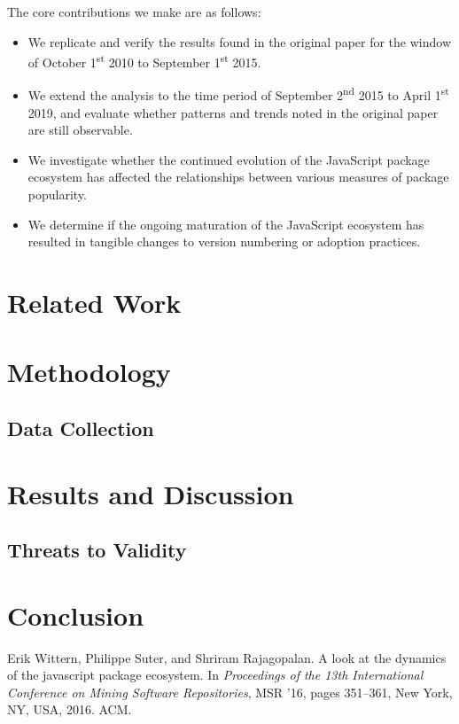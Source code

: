 \documentclass[10pt,conference]{IEEEtran}
\begin{document}
The core contributions we make are as follows:
\begin{itemize}
  \item We replicate and verify the results found in the original paper for the window of October 1\textsuperscript{st} 2010 to September 1\textsuperscript{st} 2015.
  \item We extend the analysis to the time period of September 2\textsuperscript{nd} 2015 to April 1\textsuperscript{st} 2019, and evaluate whether patterns and trends noted in the original paper are still observable.
  \item We investigate whether the continued evolution of the JavaScript package ecosystem has affected the relationships between various measures of package popularity.
  \item We determine if the ongoing maturation of the JavaScript ecosystem has resulted in tangible changes to version numbering or adoption practices.
\end{itemize}

\section{Related Work}


\section{Methodology}

\subsection{Data Collection}


\section{Results and Discussion}


\subsection{Threats to Validity}



\section{Conclusion}


\begin{thebibliography}{00}
  Erik Wittern, Philippe Suter, and Shriram Rajagopalan.
  \newblock A look at the dynamics of the javascript package ecosystem.
  \newblock In {\em Proceedings of the 13th International Conference on Mining
    Software Repositories}, MSR '16, pages 351--361, New York, NY, USA, 2016.
    ACM.



\end{thebibliography}
\vspace{12pt}
\end{document}
